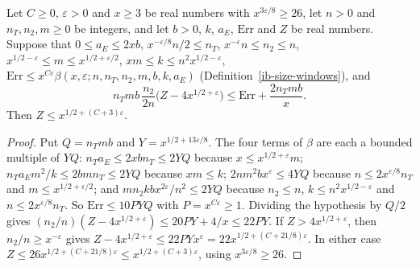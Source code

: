 \begin{lemma}\label{ib-size-arithmetic}
Let $C\geq0$, $\varepsilon>0$ and $x\geq3$ be real numbers with
$x^{3\varepsilon/8}\geq26$, let $n>0$ and $n_T,n_2,m\geq0$ be integers, and let
$b>0$, $k$, $a_E$, $\mathrm{Err}$ and $Z$ be real numbers. Suppose that
$0\leq a_E\leq2xb$, $x^{-\varepsilon/8}n/2\leq n_T$,
$x^{-\varepsilon}n\leq n_2\leq n$,
$x^{1/2-\varepsilon}\leq m\leq x^{1/2+\varepsilon/2}$,
$xm\leq k\leq n^2x^{1/2-\varepsilon}$,
$\mathrm{Err}\leq x^{C\varepsilon}\beta(x,\varepsilon;n,n_T,n_2,m,b,k,a_E)$
(Definition~\ref{ib-size-windows}), and
\[
 n_Tmb\,\frac{n_2}{2n}\bigl(Z-4x^{1/2+\varepsilon}\bigr)\leq\mathrm{Err}+\frac{2n_Tmb}x.
\]
Then $Z\leq x^{1/2+(C+3)\varepsilon}$.
\end{lemma}
\begin{proof}
Put $Q=n_Tmb$ and $Y=x^{1/2+13\varepsilon/8}$. The four terms of $\beta$ are each
a bounded multiple of $YQ$: $n_Ta_E\leq2xbn_T\leq2YQ$ because
$x\leq x^{1/2+\varepsilon}m$; $n_Ta_Em^2/k\leq2bmn_T\leq2YQ$ because $xm\leq k$;
$2nm^2bx^\varepsilon\leq4YQ$ because $n\leq2x^{\varepsilon/8}n_T$ and
$m\leq x^{1/2+\varepsilon/2}$; and $mn_2kbx^{2\varepsilon}/n^2\leq2YQ$ because
$n_2\leq n$, $k\leq n^2x^{1/2-\varepsilon}$ and $n\leq2x^{\varepsilon/8}n_T$. So
$\mathrm{Err}\leq10PYQ$ with $P=x^{C\varepsilon}\geq1$. Dividing the hypothesis
by $Q/2$ gives $(n_2/n)(Z-4x^{1/2+\varepsilon})\leq20PY+4/x\leq22PY$. If
$Z>4x^{1/2+\varepsilon}$, then $n_2/n\geq x^{-\varepsilon}$ gives
$Z-4x^{1/2+\varepsilon}\leq22PYx^\varepsilon=22x^{1/2+(C+21/8)\varepsilon}$. In
either case $Z\leq26x^{1/2+(C+21/8)\varepsilon}\leq x^{1/2+(C+3)\varepsilon}$,
using $x^{3\varepsilon/8}\geq26$.
\end{proof}

